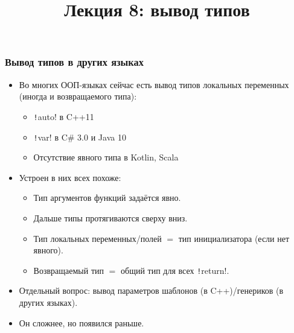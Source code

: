 \documentclass[11pt]{beamer}
\title{Лекция 8: вывод типов}
\begin{document}
\begin{frame}[plain]
  \maketitle
\end{frame}

\begin{frame}[fragile]
  \frametitle{Вывод типов в других языках}
  \begin{itemize}
    \item Во многих ООП-языках сейчас есть вывод типов локальных переменных (иногда и возвращаемого типа):
          \hspace{-1em}
          \pause
          \begin{itemize}
            \item \texttt!auto! в C++11
            \item \texttt!var! в C\# 3.0 и Java 10
            \item Отсутствие явного типа в Kotlin, Scala
          \end{itemize}
          \pause
    \item Устроен в них всех похоже:
          \begin{itemize}
            \pause
            \item Тип аргументов функций задаётся явно.
                  \pause
            \item Дальше типы протягиваются сверху вниз.
                  \pause
            \item Тип локальных переменных/полей $=$ тип инициализатора (если нет явного).
                  \pause
            \item Возвращаемый тип $=$ общий тип для всех \texttt!return!.
          \end{itemize}
          \pause
    \item Отдельный вопрос: вывод параметров шаблонов (в C++)/генериков (в других языках).
          \pause
    \item Он сложнее, но появился раньше.
  \end{itemize}
\end{frame}
\end{document}
